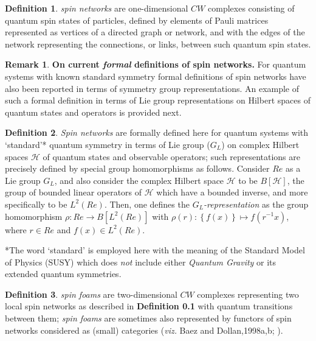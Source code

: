 \documentclass[12pt]{article}
\theoremstyle{plain}
\theoremstyle{definition}
\newtheorem{definition}{Definition}[section]
\newtheorem{remark}{Remark}[section]
\numberwithin{equation}{section}
\renewcommand{\H}{\mathcal H}
\newcommand{\med}{\medbreak}
\newcommand{\<}{{\langle}}
\begin{document}
\begin{definition} \emph{spin networks} are one-dimensional $CW$ complexes consisting of quantum spin states of particles, defined by elements of Pauli matrices represented as vertices of a directed graph or network, and with the edges of the network representing the connections, or links, between such quantum spin states.
\end{definition}
\med

\begin{remark} \textbf{On current \emph{formal} definitions of spin networks.} 
  For quantum systems with known standard symmetry formal definitions of spin networks have also been reported in terms
of symmetry group representations. An example of such a formal definition in terms of Lie group
representations on Hilbert spaces of quantum states and operators is provided next.
\end{remark}
 
\begin{definition}
\emph{Spin networks} are formally defined here for quantum systems with `standard'* quantum symmetry in terms of Lie group ($G_L$)  on complex Hilbert spaces $\H$ of quantum states and observable operators; such representations are precisely defined by special group homomorphisms as follows.  
Consider $Re$ as a Lie group $G_L$, and also consider the complex Hilbert space $\H$ to be $B[\H]$, the group of bounded linear operators of $\H$ which have a bounded inverse, and more specifically to be $L^2(Re)$. 
Then, one defines the \emph{$G_L$-representation} as the group homomorphism $\rho: Re \to B[L^2(Re)]$ with 
$\rho(r): \left\{f(x)\right\} \mapsto f(r^{-1}x)$, where $r \in Re$ and $f(x) \in L^2(Re)$.

*The word `standard' is employed here with the meaning of the Standard Model of Physics (SUSY) which does \emph{not}
include either \emph{Quantum Gravity} or its extended quantum symmetries.
\end{definition}


\begin{definition} \emph{spin foams} are two-dimensional $CW$ complexes representing two local 
spin networks as described in \textbf{Definition 0.1} with quantum transitions between them; \emph{spin foams} are sometimes also represented by functors of spin networks considered as (small) categories (\emph{viz.} Baez and Dollan,1998a,b; \cite{BAJ-DJ98a, BAJ-DJ98b}).
\end{definition}
\end{document}
